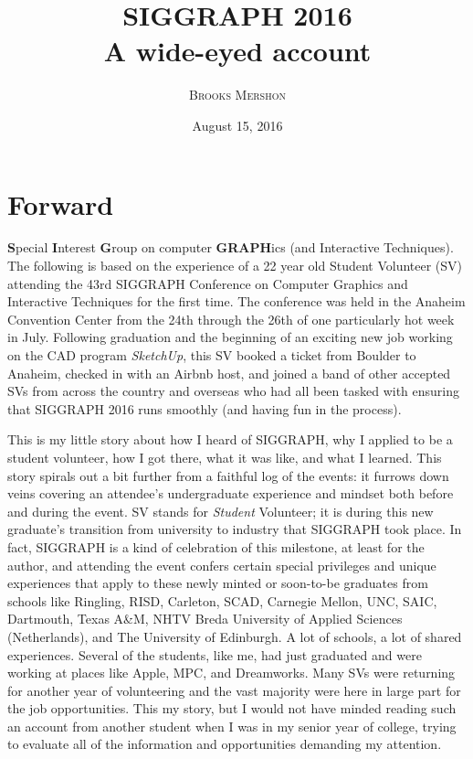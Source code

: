 \documentclass[a4paper, 11pt]{article} %
\title{\textbf{SIGGRAPH 2016}\\ %
A wide-eyed account} %
\author{\textsc{Brooks Mershon}} %
\date{August 15, 2016} %
\begin{document}
\maketitle %

\eject


\renewcommand{\abstractname}{Forward} %

\section*{Forward}
	
\textbf{S}pecial \textbf{I}nterest \textbf{G}roup on computer \textbf{GRAPH}ics (and Interactive Techniques). The following is based on the experience of a 22 year old Student Volunteer (SV) attending the 43rd SIGGRAPH Conference on Computer Graphics and Interactive Techniques for the first time. The conference was held in the Anaheim Convention Center from the 24th through the 26th of one particularly hot week in July. Following graduation and the beginning of an exciting new job working on the CAD program \textit{SketchUp}, this SV booked a ticket from Boulder to Anaheim, checked in with an Airbnb host, and joined a band of other accepted SVs from across the country and overseas who had all been tasked with ensuring that SIGGRAPH 2016 runs smoothly (and having fun in the process).

This is my little story about how I heard of SIGGRAPH, why I applied to be a student volunteer, how I got there, what it was like, and what I learned. This story spirals out a bit further from a faithful log of the events: it furrows down veins covering an attendee's undergraduate experience and mindset both before and during the event. SV stands for \textit{Student} Volunteer; it is during this new graduate's transition from university to industry that SIGGRAPH took place. In fact, SIGGRAPH is a kind of celebration of this milestone, at least for the author, and attending the event confers certain special privileges and unique experiences that apply to these newly minted or soon-to-be graduates from schools like Ringling, RISD, Carleton, SCAD, Carnegie Mellon, UNC, SAIC, Dartmouth, Texas A\&M, NHTV Breda University of Applied Sciences (Netherlands), and The University of Edinburgh. A lot of schools, a lot of shared experiences. Several of the students, like me, had just graduated and were working at places like Apple, MPC, and Dreamworks. Many SVs were returning for another year of volunteering and the vast majority were here in large part for the job opportunities. This my story, but I would not have minded reading such an account from another student when I was in my senior year of college, trying to evaluate all of the information and opportunities demanding my attention.
\end{document}
